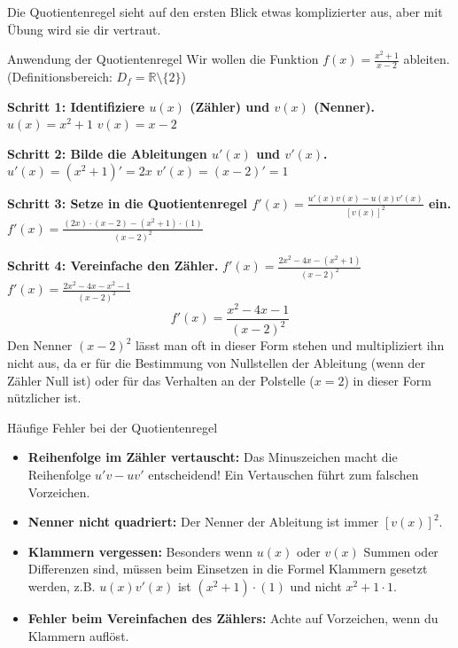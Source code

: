 Die Quotientenregel sieht auf den ersten Blick etwas komplizierter aus, aber mit Übung wird sie dir vertraut.

\begin{beispielumgebung}{Anwendung der Quotientenregel}
Wir wollen die Funktion $f(x) = \frac{x^2+1}{x-2}$ ableiten. (Definitionsbereich: $D_f = \mathbb{R} \setminus \{2\}$)

\textbf{Schritt 1: Identifiziere $u(x)$ (Zähler) und $v(x)$ (Nenner).}
$u(x) = x^2+1$
$v(x) = x-2$

\textbf{Schritt 2: Bilde die Ableitungen $u'(x)$ und $v'(x)$.}
$u'(x) = (x^2+1)' = 2x$
$v'(x) = (x-2)' = 1$

\textbf{Schritt 3: Setze in die Quotientenregel $f'(x) = \frac{u'(x)v(x) - u(x)v'(x)}{[v(x)]^2}$ ein.}
$f'(x) = \frac{(2x) \cdot (x-2) - (x^2+1) \cdot (1)}{(x-2)^2}$

\textbf{Schritt 4: Vereinfache den Zähler.}
$f'(x) = \frac{2x^2 - 4x - (x^2+1)}{(x-2)^2}$
$f'(x) = \frac{2x^2 - 4x - x^2 - 1}{(x-2)^2}$
\[ f'(x) = \frac{x^2 - 4x - 1}{(x-2)^2} \]
Den Nenner $(x-2)^2$ lässt man oft in dieser Form stehen und multipliziert ihn nicht aus, da er für die Bestimmung von Nullstellen der Ableitung (wenn der Zähler Null ist) oder für das Verhalten an der Polstelle ($x=2$) in dieser Form nützlicher ist.
\end{beispielumgebung}

\begin{fehlerboxumgebung}{Häufige Fehler bei der Quotientenregel}
\begin{itemize}
    \item \textbf{Reihenfolge im Zähler vertauscht:} Das Minuszeichen macht die Reihenfolge $u'v - uv'$ entscheidend! Ein Vertauschen führt zum falschen Vorzeichen.
    \item \textbf{Nenner nicht quadriert:} Der Nenner der Ableitung ist immer $[v(x)]^2$.
    \item \textbf{Klammern vergessen:} Besonders wenn $u(x)$ oder $v(x)$ Summen oder Differenzen sind, müssen beim Einsetzen in die Formel Klammern gesetzt werden, z.B. $u(x)v'(x)$ ist $(x^2+1) \cdot (1)$ und nicht $x^2+1 \cdot 1$.
    \item \textbf{Fehler beim Vereinfachen des Zählers:} Achte auf Vorzeichen, wenn du Klammern auflöst.
\end{itemize}
\end{fehlerboxumgebung}

